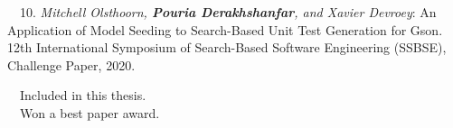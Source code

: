 \begin{etaremune}{\small
    \item[~~10.] \emph{Mitchell Olsthoorn, \textbf{Pouria Derakhshanfar}, and Xavier Devroey}: 
        An Application of Model Seeding to Search-Based Unit Test Generation for Gson.
        12th International Symposium of Search-Based Software Engineering (SSBSE), Challenge Paper,
        2020.
}\end{etaremune}
\vspace{0.5cm}
\noindent
\faFileTextO~~Included in this thesis.\\
\faTrophy~~Won a best paper award.

